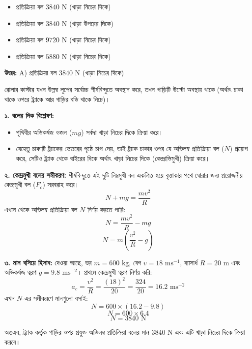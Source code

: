 \documentclass[12pt, a4paper]{article}
\begin{document}
\begin{itemize}[label={}, leftmargin=1cm, itemsep=0.5em]
\item[\textbf{A)}] প্রতিক্রিয়া বল $3840\text{ N}$ (খাড়া নিচের দিকে)
\item[\textbf{B)}] প্রতিক্রিয়া বল $3840\text{ N}$ (খাড়া উপরের দিকে)
\item[\textbf{C)}] প্রতিক্রিয়া বল $9720\text{ N}$ (খাড়া নিচের দিকে)
\item[\textbf{D)}] প্রতিক্রিয়া বল $5880\text{ N}$ (খাড়া নিচের দিকে)
\end{itemize}

\vspace{0.5em}
\begin{tcolorbox}[answerbox]
\textbf{\color{success} উত্তর:} A) প্রতিক্রিয়া বল $3840\text{ N}$ (খাড়া নিচের দিকে)
\end{tcolorbox}
\vspace{1em}

\begin{tcolorbox}[solutionbox={সমাধান (Solution)}]
\noindent
রোলার কাস্টার যখন উল্লম্ব লুপের সর্বোচ্চ শীর্ষবিন্দুতে অবস্থান করে, তখন গাড়িটি উল্টো অবস্থায় থাকে (অর্থাৎ চাকা থাকে ওপরে ট্র্যাকে আর গাড়ির বডি থাকে নিচে)। 

\vspace{0.5em}
\textbf{১. বলের দিক বিশ্লেষণ:}
\begin{itemize}[leftmargin=1.5em, itemsep=0.2em]
    \item পৃথিবীর অভিকর্ষজ ওজন ($mg$) সর্বদা খাড়া নিচের দিকে ক্রিয়া করে।
    \item যেহেতু চাকাটি ট্র্যাকের ভেতরের পৃষ্ঠে চাপ দেয়, তাই ট্র্যাক চাকার ওপর যে অভিলম্ব প্রতিক্রিয়া বল ($N$) প্রয়োগ করে, সেটিও ট্র্যাক থেকে বাইরের দিকে অর্থাৎ খাড়া নিচের দিকে (কেন্দ্রাভিমুখী) ক্রিয়া করে।
\end{itemize}

\vspace{0.5em}
\textbf{২. কেন্দ্রমুখী বলের সমীকরণ:}
শীর্ষবিন্দুতে এই দুটি নিম্নমুখী বল একত্রিত হয়ে বৃত্তাকার পথে ঘোরার জন্য প্রয়োজনীয় কেন্দ্রমুখী বল ($F_c$) সরবরাহ করে।
$$N + mg = \frac{m v^2}{R}$$
এখান থেকে অভিলম্ব প্রতিক্রিয়া বল $N$ নির্ণয় করতে পারি:
$$N = \frac{m v^2}{R} - mg$$
$$N = m \left(\frac{v^2}{R} - g\right)$$

\vspace{0.5em}
\textbf{৩. মান বসিয়ে হিসাব:}
দেওয়া আছে, ভর $m = 600\text{ kg}$, বেগ $v = 18\text{ ms}^{-1}$, ব্যাসার্ধ $R = 20\text{ m}$ এবং অভিকর্ষজ ত্বরণ $g = 9.8\text{ ms}^{-2}$।
প্রথমে কেন্দ্রমুখী ত্বরণ নির্ণয় করি:
$$a_c = \frac{v^2}{R} = \frac{(18)^2}{20} = \frac{324}{20} = 16.2\text{ ms}^{-2}$$
এখন $N$-এর সমীকরণে মানগুলো বসাই:
$$N = 600 \times (16.2 - 9.8)$$
$$N = 600 \times 6.4$$
$$N = 3840\text{ N}$$

অতএব, ট্র্যাক কর্তৃক গাড়ির ওপর প্রযুক্ত অভিলম্ব প্রতিক্রিয়া বলের মান $3840\text{ N}$ এবং এটি খাড়া নিচের দিকে ক্রিয়া করবে।
\end{tcolorbox}
\vspace{1em}
\end{document}
